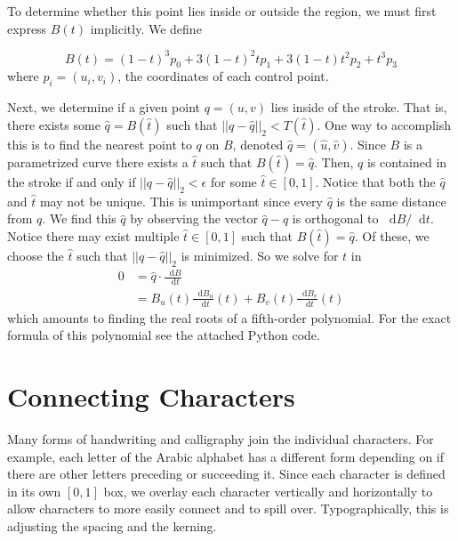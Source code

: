 \documentclass[12pt]{article}
\newcommand*\diff{\mathop{}\!\mathrm{d}}
\begin{document}
To determine whether this point lies inside or outside the region, we must first express $B(t)$ implicitly. We define

\[
	B(t) = (1 - t)^3 p_0 + 3(1 - t)^2 t p_1 + 3(1 - t)t^2 p_2 + t^3 p_3
\]
where $p_i = (u_i, v_i)$, the coordinates of each control point.

Next, we determine if a given point $q = (u,v)$ lies inside of the stroke. That is, there exists some $\hat{q} = B(\hat{t})$ such that $||q - \hat{q}||_2 < T(\hat{t})$. One way to accomplish this is to find the nearest point to $q$ on $B$, denoted $\hat{q} = (\hat{u}, \hat{v})$. Since $B$ is a parametrized curve there exists a $\hat{t}$ such that $B(\hat{t}) = \hat{q}$. Then, $q$ is contained in the stroke if and only if $||q - \hat{q}||_2 < \epsilon$ for some $\hat{t} \in [0,1]$. Notice that both the $\hat{q}$ and $\hat{t}$ may not be unique. This is unimportant since every $\hat{q}$ is the same distance from $q$. We find this $\hat{q}$ by observing the vector $\hat{q} - q$ is orthogonal to $\diff B / \diff t$. Notice there may exist multiple $\hat{t} \in [0,1]$ such that $B(\hat{t}) = \hat{q}$. Of these, we choose the $\hat{t}$ such that $||q - \hat{q}||_2$ is minimized. So we solve for $t$ in
\begin{align*}
 0 &= \hat{q} \cdot \frac{\diff B}{\diff t} \\
  &= B_u(t)\frac{\diff B_u}{\diff t}(t) + B_v(t)\frac{\diff B_v}{\diff t}(t)
\end{align*}
which amounts to finding the real roots of a fifth-order polynomial. For the exact formula of this polynomial see the attached Python code.

\section{Connecting Characters}
Many forms of handwriting and calligraphy join the individual characters. For example, each letter of the Arabic alphabet has a different form depending on if there are other letters preceding or succeeding it. Since each character is defined in its own $[0,1]$ box, we overlay each character vertically and horizontally to allow characters to more easily connect and to spill over. Typographically, this is adjusting the spacing and the kerning. 
\end{document}
